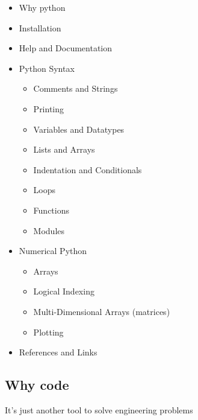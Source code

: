 \documentclass[%
oneside,                 %
final,                   %
10pt]{article}
\begin{document}
\begin{itemize}
\item Why python

\item Installation

\item Help and Documentation

\item Python Syntax
\begin{itemize}

 \item Comments and Strings

 \item Printing

 \item Variables and Datatypes

 \item Lists and Arrays

 \item Indentation and Conditionals

 \item Loops

 \item Functions

 \item Modules

\end{itemize}

\noindent
\item Numerical Python
\begin{itemize}

 \item Arrays

 \item Logical Indexing

 \item Multi-Dimensional Arrays (matrices)

 \item Plotting

\end{itemize}

\noindent
\item References and Links
\end{itemize}

\noindent
\subsection{Why code}

It's just another tool to solve engineering problems
\end{document}

